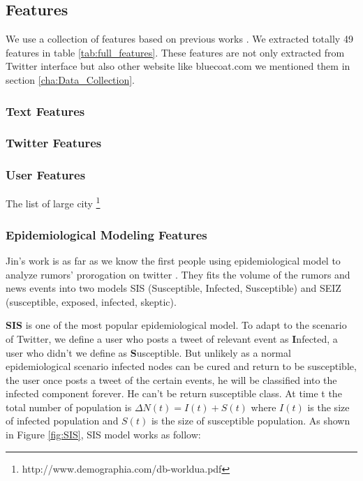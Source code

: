  \subsection{Features} 
 
 We use a collection of features based on previous works \cite{jin2013epidemiological}
\cite{mendoza2010twitter}\cite{castillo2011information}\cite{gupta2014tweetcred}\cite{yang2012automatic}\cite{liu2015real}\cite{madetecting}\cite{wu2015false}\cite{ma2015detect}. We extracted totally 49 features in table \ref{tab:full_features}. These features are not only extracted from Twitter interface but also other website like bluecoat.com we mentioned them in section \ref{cha:Data_Collection}. 
\subsubsection{Text Features}
\subsubsection{Twitter Features}
\subsubsection{User Features}
The list of large city \footnote{http://www.demographia.com/db-worldua.pdf}
\subsubsection{Epidemiological Modeling Features}
Jin's work is as far as we know the first people using epidemiological model to analyze rumors' prorogation on twitter \cite{jin2013epidemiological}. They fits the volume of the rumors and news events into two models SIS (Susceptible, Infected, Susceptible) and SEIZ (susceptible, exposed, infected, skeptic). 

\textbf{SIS} is one of the most popular epidemiological model. To adapt to the scenario of Twitter, we define a user who posts a tweet of relevant event as \textbf{I}nfected, a user who didn't we define as \textbf{S}usceptible. But unlikely as a normal epidemiological scenario infected nodes can be cured and return to be susceptible,  the user once posts a tweet of the certain events, he will be classified into the infected component forever. He can't be return susceptible class. At time t the total number of population is $\Delta N(t)= I(t) + S(t)$ where $I(t)$ is the size of infected population and  $S(t)$ is the size of susceptible population.  As shown in Figure \ref{fig:SIS}, SIS model works as follow:

